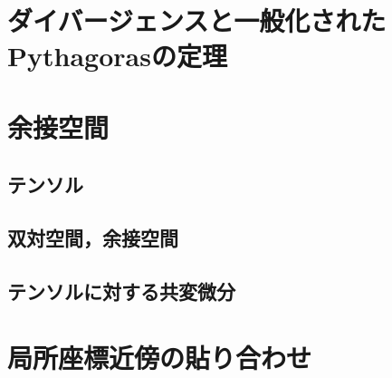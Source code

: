 \documentclass[dvipdfmx, a4paper,10pt]{jsarticle}
\theoremstyle{definition}
\begin{document}
\section{ダイバージェンスと一般化されたPythagorasの定理}


\appendix
\def\thesection{附録\Alph{section}}

\section{余接空間}
\subsection{テンソル}
\subsection{双対空間，余接空間}
\subsection{テンソルに対する共変微分}
\section{局所座標近傍の貼り合わせ}
\end{document}
